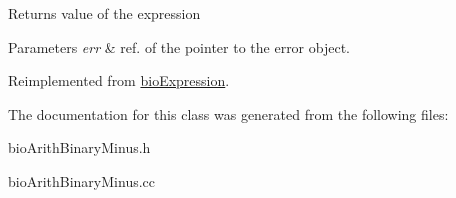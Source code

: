 \begin{DoxyReturn}{Returns}
value of the expression 
\end{DoxyReturn}

\begin{DoxyParams}{Parameters}
{\em err} & ref. of the pointer to the error object. \\
\hline
\end{DoxyParams}


Reimplemented from \hyperlink{classbio_expression_af58662a5d4d456f15bc4f2c9bd4f8a5b}{bio\+Expression}.



The documentation for this class was generated from the following files\+:\begin{DoxyCompactItemize}
\item 
bio\+Arith\+Binary\+Minus.\+h\item 
bio\+Arith\+Binary\+Minus.\+cc\end{DoxyCompactItemize}
